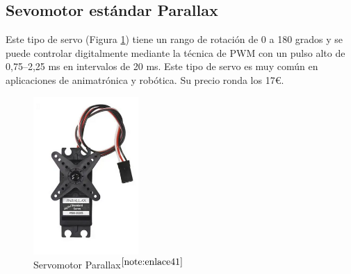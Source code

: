 \setcounter{footnote}{40} %


\subsection{Sevomotor estándar Parallax}
\label{subsec:motor}

Este tipo de servo (Figura \ref{fig:parallax}) tiene un rango de rotación de 0 a 180 grados y se puede controlar digitalmente mediante la técnica de \ac{PWM} con un pulso alto de 0,75–2,25 ms en intervalos de 20 ms. Este tipo de servo es muy común en aplicaciones de animatrónica y robótica. Su precio ronda los 17€.



\begin{figure} [h!]
	\begin{center}
		\includegraphics[width=4cm]{figs/parallax.png}
	\end{center}
	\caption{Servomotor Parallax$^{\ref{note:enlace41}}$} 
	\label{fig:parallax}
\end{figure}


